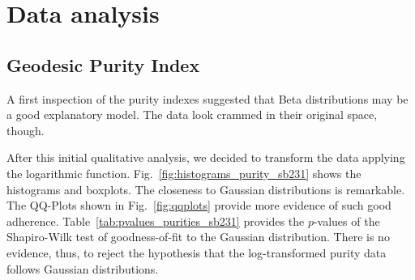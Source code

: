 \documentclass[journal]{IEEEtran}
\begin{document}
\section{Data analysis}

\subsection{Geodesic Purity Index}

A first inspection of the purity indexes suggested that Beta distributions may be a good explanatory model.
The data look crammed in their original space, though.

After this initial qualitative analysis, we decided to transform the data applying the logarithmic function.
Fig.~\ref{fig:histograms_purity_sb231} shows the histograms and boxplots. 
The closeness to Gaussian distributions is remarkable.
The QQ-Plots shown in Fig.~\ref{fig:qqplots} provide more evidence of such good adherence.
Table~\ref{tab:pvalues_purities_sb231} provides the $p$-values of the Shapiro-Wilk test of goodness-of-fit to the Gaussian distribution.
There is no evidence, thus, to reject the hypothesis that the log-transformed purity data follows Gaussian distributions.


\end{document}
